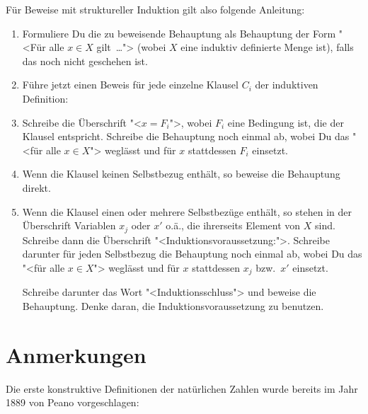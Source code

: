 Für Beweise mit struktureller Induktion gilt also folgende Anleitung:
%
\begin{enumerate}
\item Formuliere Du die zu beweisende Behauptung als
  Behauptung der Form "<Für alle $x\in X$ gilt~\ldots"> (wobei $X$
  eine induktiv definierte Menge ist), falls das noch nicht geschehen
  ist.
\item Führe jetzt einen Beweis für jede einzelne Klausel $C_i$
  der induktiven Definition:
\item Schreibe die Überschrift "<$x = F_i$">, wobei $F_i$ eine
  Bedingung ist, die der Klausel entspricht.  Schreibe die
  Behauptung noch einmal ab, wobei Du das "<für alle $x\in X$">
  weglässt und für $x$ stattdessen $F_i$ einsetzt.
\item Wenn die Klausel keinen Selbstbezug enthält, so beweise die
  Behauptung direkt.
\item Wenn die Klausel einen oder mehrere Selbstbezüge enthält, so
  stehen in der Überschrift Variablen $x_j$ oder $x'$ o.ä., die
  ihrerseits Element von $X$ sind.  Schreibe dann die Überschrift
  "<Induktionsvoraussetzung:">. Schreibe darunter für jeden
  Selbstbezug die Behauptung noch einmal ab, wobei Du das "<für alle
  $x\in X$"> weglässt und für $x$ stattdessen $x_j$ bzw.\ $x'$
  einsetzt.

  Schreibe darunter das Wort "<Induktionsschluss"> und beweise
  die Behauptung.  Denke daran, die Induktionsvoraussetzung zu
  benutzen.
\end{enumerate}

\section*{Anmerkungen}

Die erste konstruktive Definitionen der natürlichen Zahlen wurde
bereits im Jahr 1889 von {\sc Peano} vorgeschlagen:

